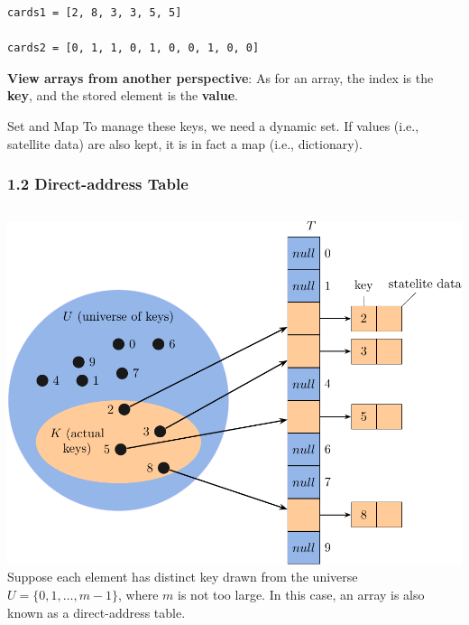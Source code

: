 \documentclass[aspectratio=169, 14pt]{beamer}
\begin{document}
\begin{frame}[fragile]

    \begin{verbatim}
cards1 = [2, 8, 3, 3, 5, 5]

cards2 = [0, 1, 1, 0, 1, 0, 0, 1, 0, 0]
    \end{verbatim}

    \textbf{ View arrays from another perspective}: As for an array, the \alert{index} is the \textbf{key}, and the stored element is the \textbf{value}. 
    
    \begin{exampleblock}{Set and Map}
To manage these keys, we need a dynamic \alert{set}. If values (i.e., satellite data) are also kept, it is in fact a \alert{map} (i.e., dictionary).
    \end{exampleblock}

\end{frame}



\begin{frame}[fragile]
    \frametitle{1.2 Direct-address Table}

\begin{columns}

    \includegraphics[width=.98\textwidth]{week11/direct}
    Suppose each element has distinct key drawn from the universe $U = \{0, 1, \dots, m - 1\}$, where $m$ is not too large. In this case, an array is also known as a \alert{direct-address table}.
\end{columns}

\end{frame}
\end{document}
